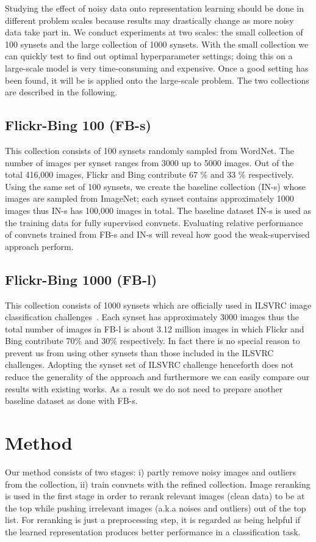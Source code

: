 \documentclass[preprint,12pt]{elsarticle}
\begin{document}
Studying the effect of noisy data onto representation learning should be done in different problem scales because results may drastically change as more noisy data take part in. We conduct experiments at two scales: the small collection of 100 synsets and the large collection of 1000 synsets. With the small collection we can quickly test to find out optimal hyperparameter settings; doing this on a large-scale model is very time-consuming and expensive. Once a good setting has been found, it will be is applied onto the large-scale problem. The two collections are described in the following.
\subsection{Flickr-Bing 100 (FB-s)} 
This collection consists of 100 synsets randomly sampled from WordNet. The number of images per synset ranges from 3000 up to 5000 images. Out of the total 416,000 images, Flickr and Bing contribute 67 \% and 33 \% respectively. Using the same set of 100 synsets, we create the baseline collection (IN-s) whose images are sampled from ImageNet; each synset contains approximately 1000 images thus IN-s has 100,000 images in total. The baseline dataset IN-s is used as the training data for fully supervised convnets. Evaluating relative performance of convnets trained from FB-s and IN-s will reveal how good the weak-supervised approach perform. 
\subsection{Flickr-Bing 1000 (FB-l)} 
This collection consists of 1000 synsets which are officially used in ILSVRC image classification challenges~\cite{ILSVRC15}. Each synset has approximately 3000 images thus the total number of images in FB-l is about 3.12 million images in which Flickr and Bing contribute 70\% and 30\% respectively. In fact there is no special reason to prevent us from using other synsets than those included in the ILSVRC challenges. Adopting the synset set of ILSVRC challenge henceforth does not reduce the generality of the approach and furthermore we can easily compare our results with existing works. As a result we do not need to prepare another baseline dataset as done with FB-s.

\section{Method}\label{sec:method}
\noindent Our method consists of two stages: i) partly remove noisy images and outliers from the collection, ii) train convnets with the refined collection. Image reranking is used in the first stage in order to rerank relevant images (clean data) to be at the top while pushing irrelevant images (a.k.a noises and outliers) out of the top list. For reranking is just a preprocessing step, it is regarded as being helpful if the learned representation produces better performance in a classification task. %
\end{document}
